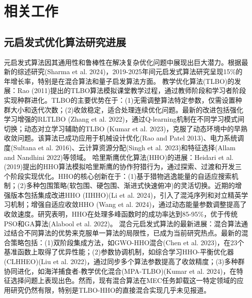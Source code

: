 \documentclass[conference]{IEEEtran}
\begin{document}


\section{相关工作}
\subsection{元启发式优化算法研究进展}\label{AA}
元启发式算法因其通用性和鲁棒性在解决复杂优化问题中展现出巨大潜力。根据最新的综述研究(Sharma et al. 2024)，2019-2025年间元启发式算法研究呈现15\%的年增长率，特别是在混合算法和量子启发算法方面。
教学优化算法(TLBO)的发展：Rao (2011)提出的TLBO算法模拟课堂教学过程，通过教师阶段和学习者阶段实现种群进化。TLBO的主要优势在于：(1)无需调整算法特定参数，仅需设置种群大小和迭代次数；(2)收敛稳定，适合处理连续优化问题。最新的改进包括强化学习增强的RLTLBO (Zhang et al. 2022)，通过Q-learning机制在不同学习模式间切换；动态对立学习辅助的TLBO (Kumar et al. 2023)，克服了动态环境中的早熟收敛问题。该算法已成功应用于机械设计优化(Rao and Patel 2013)、电力系统调度(Sultana et al. 2016)、云计算资源分配(Singh et al. 2023)和特征选择(Allam and Nandhini 2022)等领域。
哈里斯鹰优化算法(HHO)的进展：Heidari et al. (2019)提出的HHO算法模拟哈里斯鹰的协作狩猎行为，通过探索、过渡和开发三个阶段实现优化。HHO的核心创新在于：(1)基于猎物逃逸能量的自适应搜索机制；(2)多种包围策略(软包围、硬包围、渐进式快速俯冲)的灵活切换。近期的增强版本包括集成改进HHO (IIHHO)(Li et al. 2024)，引入了混沌序列和对立精英学习机制；增强自适应收敛HHO (Wang et al. 2024)，通过动态能量参数调整提高了收敛速度。研究表明，HHO在处理多峰函数时的成功率达到85-95\%，优于传统PSO和GA算法(Alabool et al. 2022)。
混合元启发式算法的最新进展：混合算法通过结合不同算法的优势来克服单一算法的局限性，已成为当前研究热点。最新的混合策略包括：(1)双阶段集成方法，如GWO-HHO混合(Chen et al. 2023)，在23个基准函数上取得了优异性能；(2)参数协调机制，如综合学习HHO-平衡优化器(CLHHEO)(Liu et al. 2022)，通过同步多个算法参数提高了收敛精度；(3)多种群协同进化，如海洋捕食者-教学优化混合(MPA-TLBO)(Kumar et al. 2024)，在特征选择问题上表现出色。然而，现有混合算法在MEC任务卸载这一特定领域的应用研究仍然有限，特别是TLBO-HHO的直接混合实现几乎未见报道。
\end{document}

